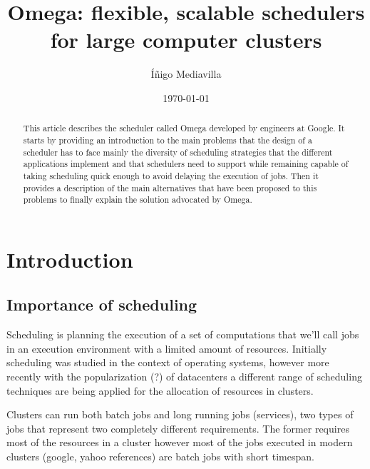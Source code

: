 \documentclass{svjour3}                     %
\begin{document}
\title{  Omega: flexible, scalable schedulers for large computer clusters  }


\author{ Íñigo Mediavilla }

\date{\today}

\maketitle

\begin{abstract}
This article describes the scheduler called Omega developed by
engineers at Google. It starts by providing an introduction to the
main problems that the design of a scheduler has to face mainly the
diversity of scheduling strategies that the different applications
implement and that schedulers need to support while remaining capable
of taking scheduling quick enough to avoid delaying the execution of
jobs. Then it provides a description of the main alternatives that
have been proposed to this problems to finally explain the solution
advocated by Omega.
\end{abstract}

\section{Introduction}

\subsection{Importance of scheduling}

Scheduling is planning the execution of a
set of computations that we'll call jobs in an execution environment
with a limited amount of resources. Initially scheduling was studied
in the context of operating systems, however more recently with the
popularization (?) of datacenters a different range of scheduling
techniques are being applied for the allocation of resources in
clusters. 

Clusters can run both batch jobs and long running jobs (services), two
types of jobs that represent two completely different requirements.
The former requires most of the resources in a cluster however most of
the jobs executed in modern clusters (google, yahoo references) are
batch jobs with short timespan.
\end{document}
